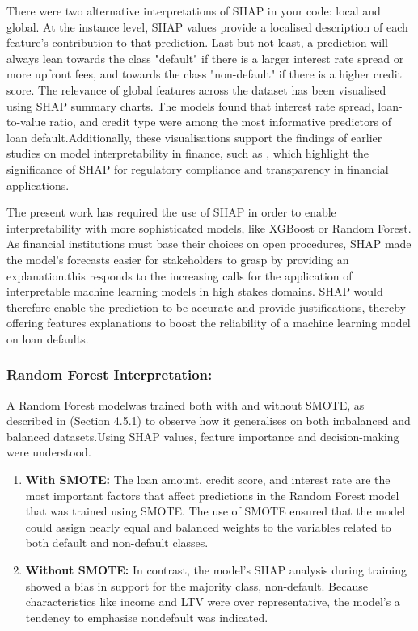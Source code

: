\documentclass[12pt, a4paper,oneside]{book}
\numberwithin{equation}{section}
\begin{document}
There were two alternative interpretations of SHAP in your code: local and global. At the instance level, SHAP values provide a localised description of each feature's contribution to that prediction. Last but not least, a prediction will always lean towards the class "default" if there is a larger interest rate spread or more upfront fees, and towards the class "non-default" if there is a higher credit score. The relevance of global features across the dataset has been visualised using SHAP summary charts. The models found that interest rate spread, loan-to-value ratio, and credit type were among the most informative predictors of loan default.Additionally, these visualisations support the findings of earlier studies on model interpretability in finance, such as \cite{chen}, which highlight the significance of SHAP for regulatory compliance and transparency in financial applications.

The present work has required the use of SHAP in order to enable interpretability with more sophisticated models, like XGBoost or Random Forest. As financial institutions must base their choices on open procedures, SHAP made the model's forecasts easier for stakeholders to grasp by providing an explanation.this responds to the increasing calls for the application of interpretable machine learning models in high stakes domains. SHAP would therefore enable the prediction to be accurate and provide justifications, thereby offering features explanations to boost the reliability of a machine learning model on loan defaults.

\subsubsection{Random Forest Interpretation:}
A Random Forest modelwas trained both with and without SMOTE, as described in (Section 4.5.1) to observe how it generalises on both imbalanced and balanced datasets.Using SHAP values, feature importance and decision-making were understood.

\begin{enumerate}
    \item\textbf{With SMOTE:} \newline
    The loan amount, credit score, and interest rate are the most important factors that affect predictions in the Random Forest model that was trained using SMOTE. The use of SMOTE ensured that the model could assign nearly equal and balanced weights to the variables related to both default and non-default classes.
    
   \item\textbf{Without SMOTE:} \newline
   In contrast, the model's SHAP analysis during training showed a bias in support for the majority class, non-default. Because characteristics like income and LTV were over representative, the model's a tendency to emphasise nondefault was indicated.
\end{enumerate}
\end{document}
